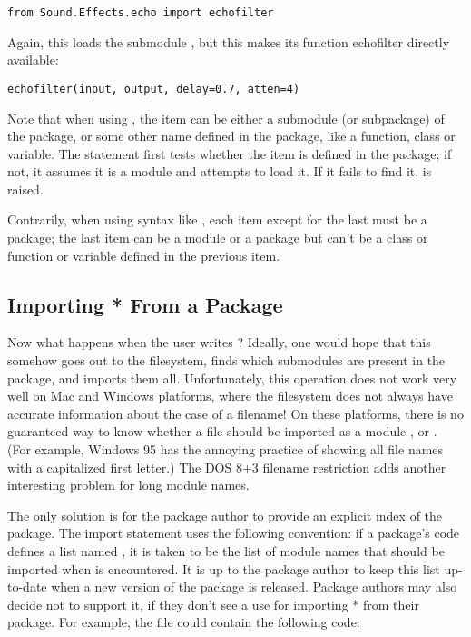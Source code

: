 \documentclass{manual}
\begin{document}
\begin{verbatim}
from Sound.Effects.echo import echofilter
\end{verbatim}

Again, this loads the submodule , but this makes its function
echofilter directly available:

\begin{verbatim}
echofilter(input, output, delay=0.7, atten=4)
\end{verbatim}

Note that when using , the
item can be either a submodule (or subpackage) of the package, or some
other name defined in the package, like a function, class or
variable.  The  statement first tests whether the item is
defined in the package; if not, it assumes it is a module and attempts
to load it.  If it fails to find it,  is raised.

Contrarily, when using syntax like , each item except for the last must be
a package; the last item can be a module or a package but can't be a
class or function or variable defined in the previous item.

\subsection{Importing * From a Package \label{pkg-import-star}}

Now what happens when the user writes ?  Ideally, one would hope that this somehow goes out to the
filesystem, finds which submodules are present in the package, and
imports them all.  Unfortunately, this operation does not work very
well on Mac and Windows platforms, where the filesystem does not
always have accurate information about the case of a filename!  On
these platforms, there is no guaranteed way to know whether a file
 should be imported as a module ,
 or .  (For example, Windows 95 has the
annoying practice of showing all file names with a capitalized first
letter.)  The DOS 8+3 filename restriction adds another interesting
problem for long module names.

The only solution is for the package author to provide an explicit
index of the package.  The import statement uses the following
convention: if a package's  code defines a list named
, it is taken to be the list of module names that should be imported
when  is
encountered.  It is up to the package author to keep this list
up-to-date when a new version of the package is released.  Package
authors may also decide not to support it, if they don't see a use for
importing * from their package.  For example, the file
 could contain the following code:
\end{document}
